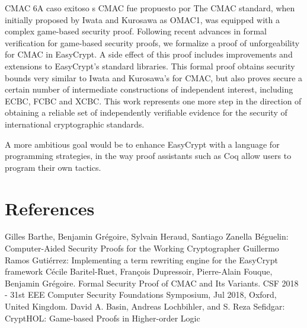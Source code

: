 \documentclass[runningheads,a4paper]{llncs}
\begin{document}
CMAC 6A caso exitoso
\cite{article7}
s
CMAC fue propuesto por 
The CMAC standard, when initially proposed by
Iwata and Kurosawa as OMAC1, was equipped with a complex
game-based security proof. Following recent advances in formal
verification for game-based security proofs, we formalize a proof
of unforgeability for CMAC in EasyCrypt. A side effect of
this proof includes improvements and extensions to EasyCrypt’s
standard libraries. This formal proof obtains security bounds
very similar to Iwata and Kurosawa’s for CMAC, but also
proves secure a certain number of intermediate constructions of
independent interest, including ECBC, FCBC and XCBC. This
work represents one more step in the direction of obtaining a
reliable set of independently verifiable evidence for the security
of international cryptographic standards.





A more ambitious goal
would be to enhance EasyCrypt with a language for programming strategies, in
the way proof assistants such as Coq allow users to program their own tactics.

\section{References}

\begin{thebibliography}{4}
Gilles Barthe, Benjamin Grégoire, Sylvain Heraud, Santiago Zanella Béguelin: Computer-Aided Security Proofs
for the Working Cryptographer
Guillermo Ramos Gutiérrez: Implementing a term rewriting
engine for the EasyCrypt framework
Cécile Baritel-Ruet, François Dupressoir, Pierre-Alain Fouque, Benjamin Grégoire. Formal Security
Proof of CMAC and Its Variants. CSF 2018 - 31st EEE Computer Security Foundations Symposium,
Jul 2018, Oxford, United Kingdom.
David A. Basin, Andreas Lochbihler, and S. Reza Sefidgar: CryptHOL: Game-based Proofs in
Higher-order Logic

\end{thebibliography}
\end{document}
